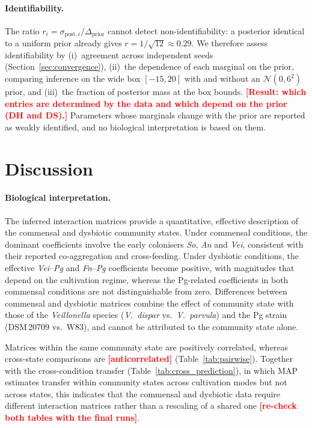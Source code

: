 \documentclass[pdflatex,sn-mathphys-num,lineno]{sn-jnl}
\newcommand{\TBD}[1]{\textcolor{red}{\textbf{[#1]}}}
\begin{document}
\paragraph{Identifiability.}
The ratio $r_i=\sigma_{\mathrm{post},i}/\Delta_{\mathrm{prior}}$ cannot detect non-identifiability: a posterior identical to a uniform prior already gives $r=1/\sqrt{12}\approx0.29$.
We therefore assess identifiability by (i)~agreement across independent seeds (Section~\ref{sec:convergence}), (ii)~the dependence of each marginal on the prior, comparing inference on the wide box $[-15,20]$ with and without an $\mathcal{N}(0,6^2)$ prior, and (iii)~the fraction of posterior mass at the box bounds.
\TBD{Result: which entries are determined by the data and which depend on the prior (DH and DS).}
Parameters whose marginals change with the prior are reported as weakly identified, and no biological interpretation is based on them.

\section{Discussion}
\label{sec:discussion}

\paragraph{Biological interpretation.}
The inferred interaction matrices provide a quantitative, effective description of the commensal and dysbiotic community states.
Under commensal conditions, the dominant coefficients involve the early colonisers \textit{So}, \textit{An} and \textit{Vei}, consistent with their reported co-aggregation and cross-feeding. Under dysbiotic conditions, the effective \textit{Vei}--\textit{Pg} and \textit{Fn}--\textit{Pg} coefficients become positive, with magnitudes that depend on the cultivation regime, whereas the Pg-related coefficients in both commensal conditions are not distinguishable from zero.
Differences between commensal and dysbiotic matrices combine the effect of community state with those of the \textit{Veillonella} species (\textit{V.~dispar} vs.\ \textit{V.~parvula}) and the Pg strain (DSM\,20709 vs.\ W83), and cannot be attributed to the community state alone.

Matrices within the same community state are positively correlated, whereas cross-state comparisons are \TBD{anticorrelated} (Table~\ref{tab:pairwise}).
Together with the cross-condition transfer (Table~\ref{tab:cross_prediction}), in which MAP estimates transfer within community states across cultivation modes but not across states, this indicates that the commensal and dysbiotic data require different interaction matrices rather than a rescaling of a shared one \TBD{re-check both tables with the final runs}.
\end{document}
